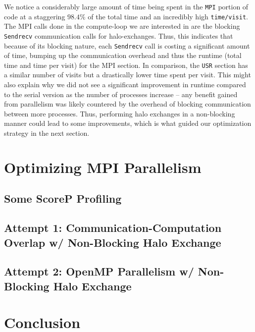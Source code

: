 \documentclass[a4paper,10pt]{article}
\begin{document}
We notice a considerably large amount of time being spent in the \verb|MPI| portion of code at a staggering $98.4\%$ of the total time and an incredibly high \verb|time/visit|. The MPI calls done in the compute-loop we are interested in are the blocking \verb|Sendrecv| communication calls for halo-exchanges. Thus, this indicates that because of its blocking nature, each \verb|Sendrecv| call is costing a significant amount of time, bumping up the communication overhead and thus the runtime (total time and time per visit) for the MPI section. In comparison, the \verb|USR| section has a similar number of visits but a drastically lower time spent per visit. This might also explain why we did not see a significant improvement in runtime compared to the serial version as the number of processes increase -- any benefit gained from parallelism was likely countered by the overhead of blocking communication between more processes. Thus, performing halo exchanges in a non-blocking manner could lead to some improvements, which is what guided our optimization strategy in the next section.

\section{Optimizing MPI Parallelism}

\subsection{Some ScoreP Profiling}

\subsection{Attempt 1: Communication-Computation Overlap w/ Non-Blocking Halo Exchange}

\subsection{Attempt 2: OpenMP Parallelism w/ Non-Blocking Halo Exchange}

\section{Conclusion}



\end{document}
